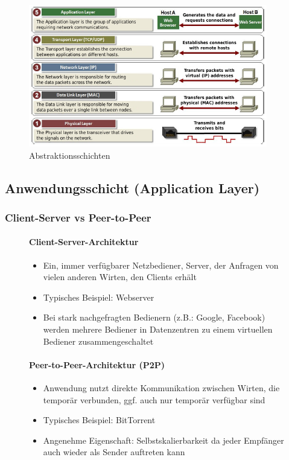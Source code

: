 \documentclass[12pt]{report}
\begin{document}
\begin{figure}[H]
  \caption{Abstraktionsschichten}
  \label{fig:abstraktionsschichten}
  \centering
  \includegraphics{abstraktionsschichten}
\end{figure}


\subsection{Anwendungsschicht (Application Layer)}
\subsubsection{Client-Server vs Peer-to-Peer}
\begin{figure}[H]
  \begin{minipage}[t]{0.45\textwidth}
    \paragraph{Client-Server-Architektur}
    \begin{itemize}
      \item Ein, immer verfügbarer Netzbediener, Server, der Anfragen von vielen anderen Wirten, den Clients erhält
      \item Typisches Beispiel: Webserver
      \item Bei stark nachgefragten Bedienern (z.B.: Google, Facebook) werden mehrere Bediener in Datenzentren zu einem virtuellen Bediener zusammengeschaltet
    \end{itemize}
  \end{minipage}
  \hfill
  \begin{minipage}[t]{0.45\textwidth}
    \paragraph{Peer-to-Peer-Architektur (P2P)}
    \begin{itemize}
      \item Anwendung nutzt direkte Kommunikation zwischen Wirten, die temporär verbunden, ggf. auch nur temporär verfügbar sind
      \item Typisches Beispiel: BitTorrent
      \item Angenehme Eigenschaft: Selbstskalierbarkeit da jeder Empfänger auch wieder als Sender auftreten kann
    \end{itemize}
  \end{minipage}
\end{figure}
\end{document}
